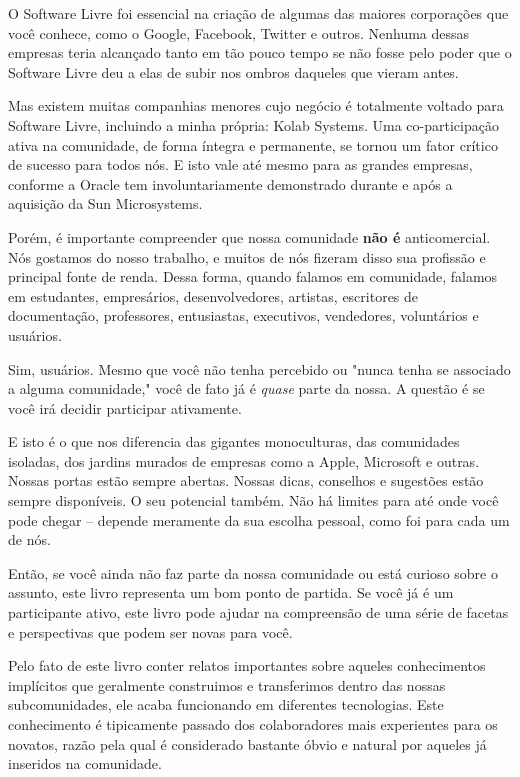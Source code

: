 O Software Livre foi essencial na criação de algumas das maiores
corporações que você conhece, como o Google, Facebook, Twitter e outros.
Nenhuma dessas empresas teria alcançado tanto em tão pouco tempo se não
fosse pelo poder que o Software Livre deu a elas de subir nos ombros daqueles
que vieram antes.

Mas existem muitas companhias menores cujo negócio é totalmente
voltado para Software Livre, incluindo a minha própria: Kolab Systems.
Uma co-participação ativa na comunidade, de forma íntegra e permanente,
se tornou um fator crítico de sucesso para todos nós. E isto vale até
mesmo para as grandes empresas, conforme a Oracle tem involuntariamente
demonstrado durante e após a aquisição da Sun Microsystems.

Porém, é importante compreender que nossa comunidade \textbf{não é}
anticomercial. Nós gostamos do nosso trabalho, e muitos de nós fizeram
disso sua profissão e principal fonte de renda. Dessa forma, quando
falamos em comunidade, falamos em estudantes, empresários, desenvolvedores,
artistas, escritores de documentação, professores, entusiastas, executivos,
vendedores, voluntários e usuários.

Sim, usuários. Mesmo que você não tenha percebido ou "nunca tenha se
associado a alguma comunidade," você de fato já é \emph{quase} parte
da nossa. A questão é se você irá decidir participar ativamente.

E isto é o que nos diferencia das gigantes monoculturas, das comunidades
isoladas, dos jardins murados de empresas como a Apple, Microsoft e
outras. Nossas portas estão sempre abertas. Nossas dicas, conselhos
e sugestões estão sempre disponíveis. O seu potencial também. Não há
limites para até onde você pode chegar -- depende meramente da sua
escolha pessoal, como foi para cada um de nós.

Então, se você ainda não faz parte da nossa comunidade ou está curioso
sobre o assunto, este livro representa um bom ponto de partida. Se
você já é um participante ativo, este livro pode ajudar na 
compreensão de uma série de facetas e perspectivas que podem ser novas
para você.

Pelo fato de este livro conter relatos importantes sobre aqueles
conhecimentos implícitos que geralmente construimos e transferimos
dentro das nossas subcomunidades, ele acaba funcionando em diferentes
tecnologias. Este conhecimento é tipicamente passado dos colaboradores
mais experientes para os novatos, razão pela qual é considerado bastante
óbvio e natural por aqueles já inseridos na comunidade.

